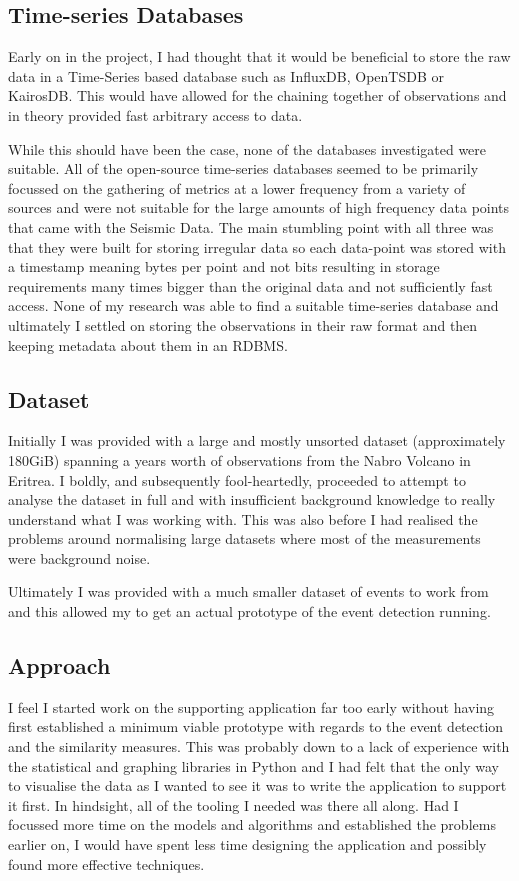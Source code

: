\documentclass[../report.tex]{subfiles}
\begin{document}
\subsection{Time-series Databases}
	Early on in the project, I had thought that it would be beneficial to store the raw data in a Time-Series based database such as InfluxDB, OpenTSDB or KairosDB.  This would have allowed for the chaining together of observations and in theory provided fast arbitrary access to data.
	
	While this should have been the case, none of the databases investigated were suitable.  All of the open-source time-series databases seemed to be primarily focussed on the gathering of metrics at a lower frequency from a variety of sources and were not suitable for the large amounts of high frequency data points that came with the Seismic Data.  The main stumbling point with all three was that they were built for storing irregular data so each data-point was stored with a timestamp meaning bytes per point and not bits resulting in storage requirements many times bigger than the original data and not sufficiently fast access.  None of my research was able to find a suitable time-series database and ultimately I settled on storing the observations in their raw format and then keeping metadata about them in an RDBMS.
	
\subsection{Dataset}
	Initially I was provided with a large and mostly unsorted dataset (approximately 180GiB) spanning a years worth of observations from the Nabro Volcano in Eritrea.  I boldly, and subsequently fool-heartedly, proceeded to attempt to analyse the dataset in full and with insufficient background knowledge to really understand what I was working with.  This was also before I had realised the problems around normalising large datasets where most of the measurements were background noise.
	
	Ultimately I was provided with a much smaller dataset of events to work from and this allowed my to get an actual prototype of the event detection running.
	
\subsection{Approach} \label{sec:ce-approach}

	I feel I started work on the supporting application far too early without having first established a minimum viable prototype with regards to the event detection and the similarity measures.  This was probably down to a lack of experience with the statistical and graphing libraries in Python and I had felt that the only way to visualise the data as I wanted to see it was to write the application to support it first.  In hindsight, all of the tooling I needed was there all along.  Had I focussed more time on the models and algorithms and established the problems earlier on, I would have spent less time designing the application and possibly found more effective techniques.
	
\end{document}

